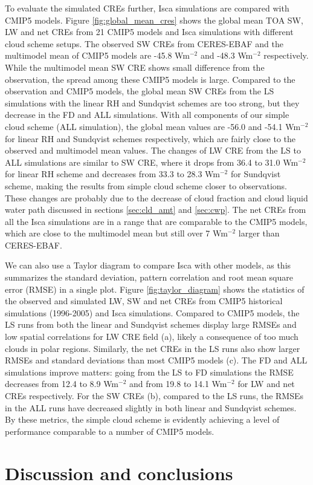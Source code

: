 To evaluate the simulated CREs further, Isca simulations are compared with CMIP5 models. Figure \ref{fig:global_mean_cres} shows the global mean TOA SW, LW and net CREs from 21 CMIP5 models and Isca simulations with different cloud scheme setups. The observed SW CREs from CERES-EBAF and the multimodel mean of CMIP5 models are -45.8 Wm$^{-2}$ and -48.3 Wm$^{-2}$ respectively. While the multimodel mean SW CRE shows small difference from the observation, the spread among these CMIP5 models is large. Compared to the observation and CMIP5 models, the global mean SW CREs from the LS simulations with the linear RH and Sundqvist schemes are too strong, but they decrease in the FD and ALL simulations. With all components of our simple cloud scheme (ALL simulation), the global mean values are -56.0 and -54.1 Wm$^{-2}$ for linear RH and Sundqvist schemes respectively, which are fairly close to the observed and multimodel mean values. The changes of LW CRE from the LS to ALL simulations are similar to SW CRE, where it drops from 36.4 to 31.0 Wm$^{-2}$ for linear RH scheme and decreases from 33.3 to 28.3 Wm$^{-2}$ for Sundqvist scheme, making the results from simple cloud scheme closer to observations. These changes are probably due to the decrease of cloud fraction and cloud liquid water path discussed in sections \ref{sec:cld_amt} and \ref{sec:cwp}. The net CREs from all the Isca simulations are in a range that are comparable to the CMIP5 models, which are close to the multimodel mean but still over 7 Wm$^{-2}$ larger than CERES-EBAF.

We can also use a Taylor diagram \citep{Taylor2001} to compare Isca with other models, as this summarizes the standard deviation, pattern correlation and root mean square error (RMSE) in a single plot. Figure \ref{fig:taylor_diagram} shows the statistics of the observed and simulated LW, SW and net CREs from CMIP5 historical simulations (1996-2005) and Isca simulations. Compared to CMIP5 models, the LS runs from both the linear and Sundqvist schemes display large RMSEs and low spatial correlations for LW CRE field (a), likely a consequence of too much clouds in polar regions. Similarly, the net CREs in the LS runs also show larger RMSEs and standard deviations than most CMIP5 models (c). The FD and ALL simulations improve matters: going from the LS to FD simulations the RMSE decreases from 12.4 to 8.9 Wm$^{-2}$ and from 19.8 to 14.1 Wm$^{-2}$ for LW and net CREs respectively. For the SW CREs (b), compared to the LS runs, the RMSEs in the ALL runs have decreased slightly in both linear and Sundqvist schemes.  By these metrics, the  simple cloud scheme  is evidently achieving a level of performance comparable to a number of CMIP5 models.


\section{Discussion and conclusions}
